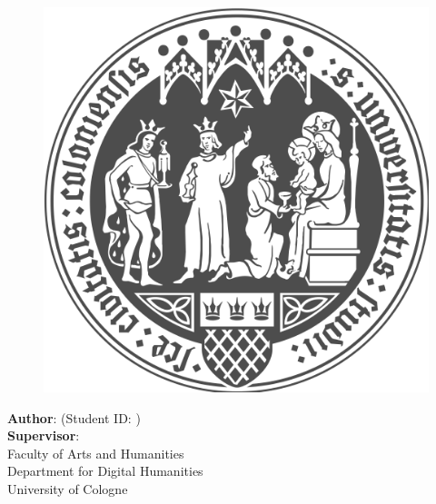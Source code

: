 \makeatletter
\begin{titlepage}
  \begin{center}
    \vspace*{1cm}

    \Large
    \textbf{\@title}

    \vspace{1.5cm}

    \thesistype{}

    \vspace{1cm}

    \begin{figure}[htbp]
      \centering
      \includegraphics[width=.5\linewidth]{assets/uzk/UoC_Logo.png}
    \end{figure}

    \vspace{1cm}

    \large
    \textbf{Author}: \thesisauthor{} (Student ID: \studentID{})\\
    \large
    \textbf{Supervisor}: \supervisor{}\\

    \vspace{1cm}
    \large
    Faculty of Arts and Humanities\\
    Department for Digital Humanities\\
    University of Cologne\\

    \vspace{1cm}
    \@date

  \end{center}
\end{titlepage}
\makeatother